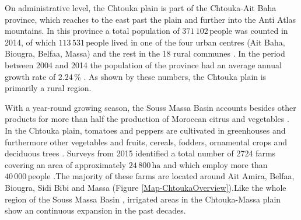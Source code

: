 On administrative level, the Chtouka plain is part of the Chtouka-Ait Baha province, which reaches to the east past the plain and further into the Anti Atlas mountains. In this province a total population of $371 \, 102 \, \textrm{people}$ was counted in 2014, of which $113 \, 531 \, \textrm{people}$ lived in one of the four urban centres (Ait Baha, Biougra, Belfaa, Massa) and the rest in the 18 rural communes \parencite{DRSM.2020}. In the period between 2004 and 2014 the population of the province had an average annual growth rate of $2.24 \, \%$ \parencite{DRSM.2020}. As shown by these numbers, the Chtouka plain is primarily a rural region.

With a year-round growing season, the Souss Massa Basin accounts besides other products for more than half the production of Moroccan citrus and vegetables \parencite{Hssaisoune.2017}. In the Chtouka plain, tomatoes and peppers are cultivated in greenhouses \parencite{DRSM.2020} and furthermore other vegetables and fruits, cereals, fodders, ornamental crops and deciduous trees \parencite{ORMVASM.2015}. Surveys from 2015 identified a total number of 2724 farms covering an area of approximately $24\,800 \, \textrm{ha}$ and which employ more than $40\,000 \, \textrm{people}$ \parencite{ABHSMD.2015}.The majority of these farms are located around Ait Amira, Belfaa, Biougra, Sidi Bibi and Massa (Figure \ref{Map-ChtoukaOverview}).Like the whole region of the Souss Massa Basin \parencite{Choukr.2017}, irrigated areas in the Chtouka-Massa plain show an continuous expansion in the past decades.

